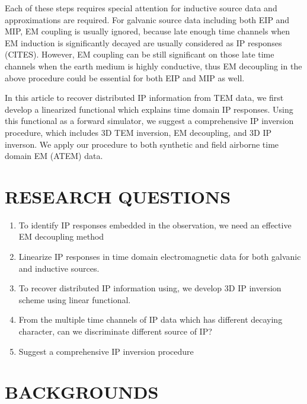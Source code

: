 \documentclass[letterpaper,11pt]{article}
\begin{document}
Each of these steps requires special attention for inductive source data and approximations are required. For galvanic source data including both EIP and MIP, EM coupling is usually ignored, because late enough time channels when EM induction is significantly decayed are usually considered as IP responses (CITES). However, EM coupling can be still significant on those late time channels when the earth medium is highly conductive, thus EM decoupling in the above procedure could be essential for both EIP and MIP as well.

In this article to recover distributed IP information from TEM data, we first develop a linearized functional which explains time domain IP responses. Using this functional as a forward simulator, we suggest a comprehensive IP inversion procedure, which includes 3D TEM inversion, EM decoupling, and 3D IP inverson. We apply our procedure to both synthetic and field airborne time domain EM (ATEM) data. 

\section{RESEARCH QUESTIONS}
\begin{enumerate}
	\item To identify IP responses embedded in the observation, we need an effective EM decoupling method
	\item Linearize IP responses in time domain electromagnetic data for both galvanic and inductive sources. 
	\item To recover distributed IP information using, we develop 3D IP inversion scheme using linear functional. 
	\item From the multiple time channels of IP data which has different decaying character, can we discriminate 	different source of IP?
	\item Suggest a comprehensive IP inversion procedure 
\end{enumerate}


\section{BACKGROUNDS}
\end{document}
